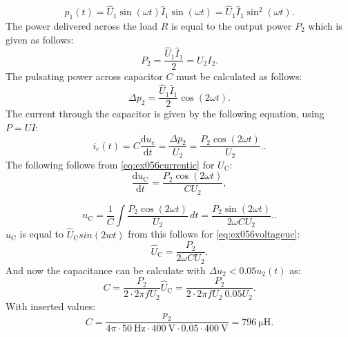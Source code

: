\begin{solutionblock}
    \begin{equation}
        p_\mathrm{1}(t) = \hat U_\mathrm{1} \sin(\omega t) \hat I_\mathrm{1} \sin(\omega t) = \hat U_\mathrm{1} \hat I_\mathrm{1} \sin^2(\omega t).
    \end{equation}
    The power delivered across the load $R$ is equal to the output power $P_\mathrm{2}$ which is given as follows:
    \begin{equation}
        P_\mathrm{2} = \frac{\hat U_\mathrm{1}\hat I_\mathrm{1}}{2} = U_\mathrm{2} I_\mathrm{2}.
    \end{equation}
    The pulsating power across capacitor $C$ must be calculated as follows:
    \begin{equation}
        \Delta p_\mathrm{2} = \frac{\hat U_\mathrm{1}\hat I_\mathrm{1}}{2} \cos(2\omega t).
    \end{equation}
    The current through the capacitor is given by the following equation, using $P = UI$:
    \begin{equation}
        i_\mathrm{c}(t)=C \frac{\mathrm{d}u_\mathrm{c}}{\mathrm{d}t} = \frac{\Delta p_\mathrm{2}}{U_\mathrm{2}} = \frac{P_\mathrm{2}\cos(2\omega t)}{U_\mathrm{2}}.\label{eq:ex056currentic}.
    \end{equation}
    The following follows from \eqref{eq:ex056currentic} for $U_\mathrm{C}$:
    \begin{equation}
        \frac{\mathrm{d}u_\mathrm{C}}{\mathrm{d}t} = \frac{P_\mathrm{2}\cos (2\omega t)}{C U_\mathrm{2}},
    \end{equation}

    \begin{equation}
        u_\mathrm{C} = \frac{1}{C} \int \frac{P_\mathrm{2}\cos(2\omega t)}{U_\mathrm{2}} \, dt = \frac{P_\mathrm{2}\sin(2\omega t)}{2\omega C U_\mathrm{2}}.\label{eq:ex056voltageuc}.
    \end{equation}
    $u_\mathrm{C}$ is equal to $ \hat U_\mathrm{C} sin(2wt)$ from this follows for \eqref{eq:ex056voltageuc}:
    \begin{equation}
        \hat U_\mathrm{C} = \frac{P_\mathrm{2}}{2\omega C U_\mathrm{2}}.
    \end{equation}
    And now the capacitance can be calculate with $\Delta u_{\mathrm{2}}<0.05  u_{\mathrm{2}}(t)$ as:
    \begin{equation}
        C = \frac{P_\mathrm{2}}{2\cdot 2\pi f  U_\mathrm{2} }  \hat U_\mathrm{C} = \frac{P_\mathrm{2}}{2\cdot 2\pi f  U_\mathrm{2}\  0.05 U_\mathrm{2}}.  
    \end{equation}
    With inserted values:
    \begin{equation}
        C = \frac{p_\mathrm{2}}{4 \pi \cdot\SI{50}{\hertz}\cdot\SI{400}{\volt}\cdot 0.05 \cdot \SI{400}{\volt}} = \SI{796}{\micro\henry}.
    \end{equation}
\end{solutionblock}
